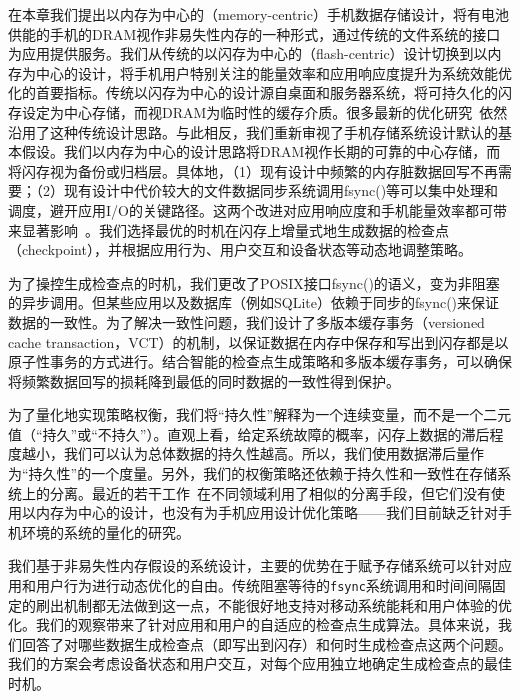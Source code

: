 在本章我们提出以内存为中心的（memory-centric）手机数据存储设计，将有电池供能的手机的DRAM视作非易失性内存的一种形式，通过传统的文件系统的接口为应用提供服务。我们从传统的以闪存为中心的（flash-centric）设计切换到以内存为中心的设计，将手机用户特别关注的能量效率和应用响应度提升为系统效能优化的首要指标。传统以闪存为中心的设计源自桌面和服务器系统，将可持久化的闪存设定为中心存储，而视DRAM为临时性的缓存介质。很多最新的优化研究~\cite{Jeong:2013:ISO:2535461.2535499, 6558430, Kim:2014:RJJ:2591305.2591332,
Nguyen:2014:ISR:2638728.2638841, Nguyen:2014:SAL:2638728.2638763,
Nguyen:2013:SSE:2493432.2493505, 6986137}依然沿用了这种传统设计思路。与此相反，我们重新审视了手机存储系统设计默认的基本假设。我们以内存为中心的设计思路将DRAM视作长期的可靠的中心存储，而将闪存视为备份或归档层。具体地，（1）现有设计中频繁的内存脏数据回写不再需要；（2）现有设计中代价较大的文件数据同步系统调用fsync()等可以集中处理和调度，避开应用I/O的关键路径。这两个改进对应用响应度和手机能量效率都可带来显著影响~\cite{Desnoyers:2013:SRN:2534861.2534867,Kim:RSS:2012, Lee:2012:SLD:2380356.2380367,Nguyen:2014:ISR:2638728.2638841}。我们选择最优的时机在闪存上增量式地生成数据的检查点（checkpoint），并根据应用行为、用户交互和设备状态等动态地调整策略。

为了操控生成检查点的时机，我们更改了POSIX接口fsync()的语义，变为非阻塞的异步调用。但某些应用以及数据库（例如SQLite）依赖于同步的fsync()来保证数据的一致性。为了解决一致性问题，我们设计了多版本缓存事务（versioned cache transaction，VCT）的机制，以保证数据在内存中保存和写出到闪存都是以原子性事务的方式进行。结合智能的检查点生成策略和多版本缓存事务，可以确保将频繁数据回写的损耗降到最低的同时数据的一致性得到保护。

为了量化地实现策略权衡，我们将“持久性”解释为一个连续变量，而不是一个二元值（“持久”或“不持久”）。直观上看，给定系统故障的概率，闪存上数据的滞后程度越小，我们可以认为总体数据的持久性越高。所以，我们使用数据滞后量作为“持久性”的一个度量。另外，我们的权衡策略还依赖于持久性和一致性在存储系统上的分离。最近的若干工作~\cite{Chidambaram:2013:OCC:2517349.2522726,
Mickens:2014:BFC:2616448.2616473}在不同领域利用了相似的分离手段，但它们没有使用以内存为中心的设计，也没有为手机应用设计优化策略——我们目前缺乏针对手机环境的系统的量化的研究。

我们基于非易失性内存假设的系统设计，主要的优势在于赋予存储系统可以针对应用和用户行为进行动态优化的自由。传统阻塞等待的\texttt{fsync}系统调用和时间间隔固定的刷出机制都无法做到这一点，不能很好地支持对移动系统能耗和用户体验的优化。我们的观察带来了针对应用和用户的自适应的检查点生成算法。具体来说，我们回答了对哪些数据生成检查点（即写出到闪存）和何时生成检查点这两个问题。我们的方案会考虑设备状态和用户交互，对每个应用独立地确定生成检查点的最佳时机。


